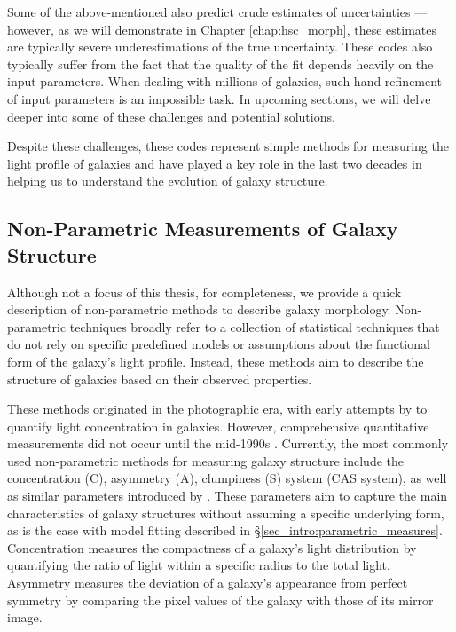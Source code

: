 Some of the above-mentioned also predict crude estimates of uncertainties --- however, as we will demonstrate in Chapter \ref{chap:hsc_morph}, these estimates are typically severe underestimations of the true uncertainty. These codes also typically suffer from the fact that the quality of the fit depends heavily on the input parameters. When dealing with millions of galaxies, such hand-refinement of input parameters is an impossible task. In upcoming sections, we will delve deeper into some of these challenges and potential solutions. 

Despite these challenges, these codes represent simple methods for measuring the light profile of galaxies and have played a key role in the last two decades in helping us to understand the evolution of galaxy structure.

\subsection{Non-Parametric Measurements of Galaxy Structure} \label{sec_intro:non_parametric_measures}

Although not a focus of this thesis, for completeness, we provide a quick description of non-parametric methods to describe galaxy morphology. Non-parametric techniques broadly refer to a collection of statistical techniques that do not rely on specific predefined models or assumptions about the functional form of the galaxy's light profile. Instead, these methods aim to describe the structure of galaxies based on their observed properties.

These methods  originated in the photographic era, with early attempts by \citet{morgan_62} to quantify light concentration in galaxies. However, comprehensive quantitative measurements did not occur until the mid-1990s \citep{rix_95,conselice_97}. Currently, the most commonly used non-parametric methods for measuring galaxy structure include the concentration (C), asymmetry (A), clumpiness (S) system (CAS system), as well as similar parameters introduced by \citet{takamiya_99, papovich_03, abraham_03, lotz_04}. These parameters aim to capture the main characteristics of galaxy structures without assuming a specific underlying form, as is the case with model fitting described in \S \ref{sec_intro:parametric_measures}. Concentration measures the compactness of a galaxy's light distribution by quantifying the ratio of light within a specific radius to the total light. Asymmetry measures the deviation of a galaxy's appearance from perfect symmetry by comparing the pixel values of the galaxy with those of its mirror image.

